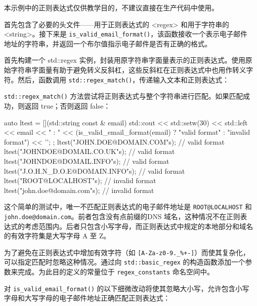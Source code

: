 \begin{myTip}
本示例中的正则表达式仅供教学目的，不建议直接在生产代码中使用。
\end{myTip}

首先包含了必要的头文件——用于正则表达式的 <regex> 和用于字符串的 <string>。接下来是 \verb|is_valid_email_format()|，该函数接收一个表示电子邮件地址的字符串，并返回一个布尔值指示电子邮件是否有正确的格式。

首先构建一个 std::regex 实例，封装用原字符串字面量表示的正则表达式。使用原始字符串字面量有助于避免转义反斜杠，这些反斜杠在正则表达式中也用作转义字符。然后，函数调用 \verb|std::regex_match()|，传递输入文本和正则表达式：


\verb|std::regex_match()| 方法尝试将正则表达式与整个字符串进行匹配。如果匹配成功，则返回 true；否则返回 false：

\begin{cpp}
auto ltest = [](std::string const & email)
{
    std::cout << std::setw(30) << std::left
    << email << " : "
    << (is_valid_email_format(email) ?
    "valid format" : "invalid format")
    << '\n';
};
ltest("JOHN.DOE@DOMAIN.COM"s);         // valid format
ltest("JOHNDOE@DOMAIL.CO.UK"s);        // valid format
ltest("JOHNDOE@DOMAIL.INFO"s);         // valid format
ltest("J.O.H.N_D.O.E@DOMAIN.INFO"s);   // valid format
ltest("ROOT@LOCALHOST"s);              // invalid format
ltest("john.doe@domain.com"s);         // invalid format
\end{cpp}

这个简单的测试中，唯一不匹配正则表达式的电子邮件地址是 \verb|ROOT@LOCALHOST| 和 \verb|john.doe@domain.com|。前者包含没有点前缀的DNS 域名，这种情况不在正则表达式的考虑范围内。后者只包含小写字母，而正则表达式中规定的本地部分和域名的有效字符集是大写字母 A 至 Z。

为了避免在正则表达式中增加有效字符（如 \verb|[A-Za-z0-9._%+-]|）而使其复杂化，可以指定匹配时忽略这种情况。通过向 \verb|std::basic_regex| 的构造函数添加一个参数来完成。为此目的定义的常量位于 \verb|regex_constants| 命名空间中。

对 \verb|is_valid_email_format()| 的以下细微改动将使其忽略大小写，允许包含小写字母和大写字母的电子邮件地址正确匹配正则表达式：

